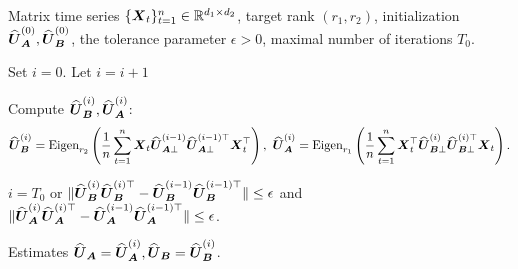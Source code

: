 \documentclass[11pt,letterpaper]{article}
\theoremstyle{definition}
\begin{document}
\begin{algorithm}[ht]
\caption{COMplement-Projected Alternating Subspace Estimation (COMPAS)}
\label{alg: COMPAS}
\begin{algorithmic}[1]
\Require Matrix time series $\{\boldsymbol{X}_t\}_{t=1}^n \in \mathbb{R}^{d_1 \times d_2}$, target rank $(r_1, r_2)$, initialization $\widehat{\boldsymbol{U}}_{\boldsymbol{A}}^{(0)}, \widehat{\boldsymbol{U}}_{\boldsymbol{B}}^{(0)}$, the tolerance parameter $\epsilon>0$, maximal number of iterations $T_0$. 

\State Set $i=0$.
\Repeat 
\State Let $i=i+1$

\State Compute $\widehat{\boldsymbol{U}}_{\boldsymbol{B}}^{(i)}, \widehat{\boldsymbol{U}}_{\boldsymbol{A}}^{(i)}$:
\begin{align*}
\widehat{\boldsymbol{U}}_{\boldsymbol{B}}^{(i)} = \text{Eigen}_{r_2} \left(\frac{1}{n}\sum_{t=1}^n \boldsymbol{X}_t \widehat{\boldsymbol{U}}_{\boldsymbol{A}\perp}^{(i-1)} \widehat{\boldsymbol{U}}_{\boldsymbol{A}\perp}^{(i-1)\top} \boldsymbol{X}_t^\top \right), \     \widehat{\boldsymbol{U}}_{\boldsymbol{A}}^{(i)} =\text{Eigen}_{r_1} \left(\frac{1}{n} \sum_{t=1}^n \boldsymbol{X}_t^\top \widehat{\boldsymbol{U}}_{\boldsymbol{B}\perp}^{(i)} \widehat{\boldsymbol{U}}_{\boldsymbol{B}\perp}^{(i)\top} \boldsymbol{X}_t \right).
\end{align*}


\Until $i=T_0$ or $\|\widehat{\boldsymbol{U}}_{\boldsymbol{B}}^{(i)}\widehat{\boldsymbol{U}}_{\boldsymbol{B}}^{(i)\top}-\widehat{\boldsymbol{U}}_{\boldsymbol{B}}^{(i-1)}\widehat{\boldsymbol{U}}_{\boldsymbol{B}}^{(i-1)\top}\|\le\epsilon$ and $\|\widehat{\boldsymbol{U}}_{\boldsymbol{A}}^{(i)}\widehat{\boldsymbol{U}}_{\boldsymbol{A}}^{(i)\top}-\widehat{\boldsymbol{U}}_{\boldsymbol{A}}^{(i-1)}\widehat{\boldsymbol{U}}_{\boldsymbol{A}}^{(i-1)\top}\|\le\epsilon$.

\Ensure Estimates $\widehat{\boldsymbol{U}}_{\boldsymbol{A}}=\widehat{\boldsymbol{U}}_{\boldsymbol{A}}^{(i)}, \widehat{\boldsymbol{U}}_{\boldsymbol{B}}=\widehat{\boldsymbol{U}}_{\boldsymbol{B}}^{(i)}$.
\end{algorithmic}
\end{algorithm}
\end{document}
